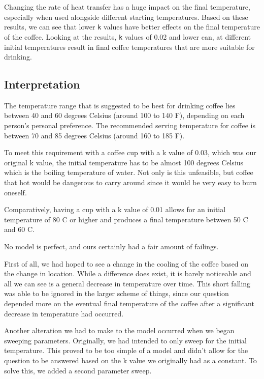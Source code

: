 \documentclass[11pt]{article}
\begin{document}
Changing the rate of heat transfer has a huge impact on the final
temperature, especially when used alongside different starting
temperatures. Based on these results, we can see that lower \texttt{k}
values have better effects on the final temperature of the coffee.
Looking at the results, \texttt{k} values of 0.02 and lower can, at
different initial temperatures result in final coffee temperatures that
are more suitable for drinking.

    \hypertarget{interpretation}{%
\subsection{Interpretation}\label{interpretation}}

The temperature range that is suggested to be best for drinking coffee
lies between 40 and 60 degrees Celsius (around 100 to 140 F), depending
on each person's personal preference. The recommended serving
temperature for coffee is between 70 and 85 degrees Celsius (around 160
to 185 F).

To meet this requirement with a coffee cup with a k value of 0.03, which
was our original k value, the initial temperature has to be almost 100
degrees Celsius which is the boiling temperature of water. Not only is
this unfeasible, but coffee that hot would be dangerous to carry around
since it would be very easy to burn oneself.

Comparatively, having a cup with a k value of 0.01 allows for an initial
temperature of 80 C or higher and produces a final temperature between
50 C and 60 C.

    No model is perfect, and ours certainly had a fair amount of failings.

First of all, we had hoped to see a change in the cooling of the coffee
based on the change in location. While a difference does exist, it is
barely noticeable and all we can see is a general decrease in
temperature over time. This short falling was able to be ignored in the
larger scheme of things, since our question depended more on the
eventual final temperature of the coffee after a significant decrease in
temperature had occurred.

Another alteration we had to make to the model occurred when we began
sweeping parameters. Originally, we had intended to only sweep for the
initial temperature. This proved to be too simple of a model and didn't
allow for the question to be answered based on the k value we originally
had as a constant. To solve this, we added a second parameter sweep.
\end{document}
